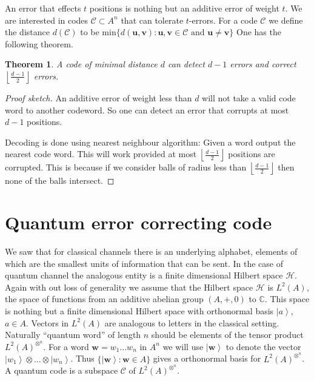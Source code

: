\documentclass[11pt,twoside]{article}
\newtheorem{theorem}{Theorem}[section]
\theoremstyle{definition}
\theoremstyle{remark}
\newcommand{\Dist}[2]{\ensuremath{d\left(#1,#2\right)}}
\newcommand{\ket}[1]{\ensuremath{\left\vert #1 \right\rangle}}
\newcommand{\LN}[1]{\ensuremath{L^2\left(#1\right)^{\otimes^n}}}
\newcommand{\floor}[1]{\ensuremath{\left\lfloor #1 \right\rfloor}}
\begin{document}
An error that effects $t$ positions is nothing but an additive error
of weight $t$. We are interested in codes $\mathcal{C} \subset A^n$
that can tolerate $t$-errors. For a code $\mathcal{C}$ we define the
distance $d(\mathcal{C})$ to be
$\mathrm{min}\{\Dist{\mathbf{u}}{\mathbf{v}} : \mathbf{u},\mathbf{v}
\in \mathcal{C} \textrm{ and } \mathbf{u} \neq \mathbf{v} \}$ One has
the following theorem.

\begin{theorem}\label{thm-classical-t-error}
  A code of minimal distance $d$ can \emph{detect} $d-1$ errors and
  \emph{correct} $\floor{\frac{d-1}{2}}$ errors.
\end{theorem}
\begin{proof}[Proof sketch]
  An additive error of weight less than $d$ will not take a valid code
  word to another codeword. So one can detect an error that corrupts
  at most $d-1$ positions.
  
  Decoding is done using nearest neighbour algorithm: Given a word
  output the nearest code word. This will work provided at most
  $\floor{\frac{d-1}{2}}$ positions are corrupted. This is because if
  we consider balls of radius less than $\floor{\frac{d-1}{2}}$ then
  none of the balls intersect.
\end{proof}

\section{Quantum error correcting code}

We saw that for classical channels there is an underlying alphabet,
elements of which are the smallest units of information that can be
sent. In the case of quantum channel the analogous entity is a finite
dimensional Hilbert space $\mathcal{H}$. Again with out loss of
generality we assume that the Hilbert space $\mathcal{H}$ is $L^2(A)$,
the space of functions from an additive abelian group $(A,+,0)$ to
$\mathbb{C}$.  This space is nothing but a finite dimensional Hilbert
space with orthonormal basis $\ket{a}$, $a \in A$.  Vectors in
$L^2(A)$ are analogous to letters in the classical setting.  Naturally
``quantum word'' of length $n$ should be elements of the tensor
product $L^2(A)^{\otimes^n}$.  For a word $\mathbf{w} = w_1\ldots w_n$
in $A^n$ we will use $\ket{\mathbf{w}}$ to denote the vector
$\ket{w_1}\otimes\ldots\otimes\ket{w_n}$. Thus $\{ \ket{\mathbf{w}} :
\mathbf{w} \in A \}$ gives a orthonormal basis for $\LN{A}$.  A
quantum code is a subspace $\mathcal{C}$ of $\LN{A}$.
\end{document}
